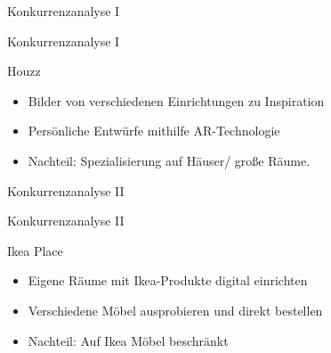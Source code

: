 \documentclass[presentation,bigger,aspectratio=169]{beamer}
\begin{document}
\begin{frame}[label={sec:org458d1d7}]{Konkurrenzanalyse I}
\end{frame}

\begin{frame}[label={sec:orgafa6f9a}]{Konkurrenzanalyse I}
\begin{block}{Houzz}
\begin{itemize}
\item Bilder von verschiedenen Einrichtungen zu Inspiration
\item Persönliche Entwürfe mithilfe AR-Technologie
\item Nachteil: Spezialisierung auf Häuser/ große Räume.
\end{itemize}
\end{block}
\end{frame}
\begin{frame}[label={sec:org019a8da}]{Konkurrenzanalyse II}
\end{frame}
\begin{frame}[label={sec:org3debec5}]{Konkurrenzanalyse II}
\begin{block}{Ikea Place}
\begin{itemize}
\item Eigene Räume mit Ikea-Produkte digital einrichten
\item Verschiedene Möbel ausprobieren und direkt bestellen
\item Nachteil: Auf Ikea Möbel beschränkt
\end{itemize}
\end{block}
\end{frame}
\end{document}

